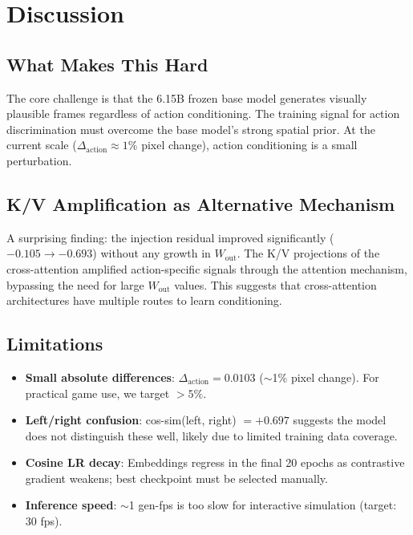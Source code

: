 \documentclass[10pt,twocolumn]{article}
\begin{document}
\section{Discussion}

\subsection{What Makes This Hard}

The core challenge is that the 6.15B frozen base model generates visually plausible frames regardless of action conditioning. The training signal for action discrimination must overcome the base model's strong spatial prior. At the current scale ($\Delta_\text{action} \approx 1\%$ pixel change), action conditioning is a small perturbation.

\subsection{K/V Amplification as Alternative Mechanism}

A surprising finding: the injection residual improved significantly ($-0.105 \to -0.693$) without any growth in $W_\text{out}$. The K/V projections of the cross-attention amplified action-specific signals through the attention mechanism, bypassing the need for large $W_\text{out}$ values. This suggests that cross-attention architectures have multiple routes to learn conditioning.

\subsection{Limitations}

\begin{itemize}
  \item \textbf{Small absolute differences}: $\Delta_\text{action} = 0.0103$ ($\sim$1\% pixel change). For practical game use, we target $> 5\%$.
  \item \textbf{Left/right confusion}: cos-sim(left, right) $= +0.697$ suggests the model does not distinguish these well, likely due to limited training data coverage.
  \item \textbf{Cosine LR decay}: Embeddings regress in the final 20 epochs as contrastive gradient weakens; best checkpoint must be selected manually.
  \item \textbf{Inference speed}: $\sim$1 gen-fps is too slow for interactive simulation (target: 30 fps).
\end{itemize}
\end{document}
